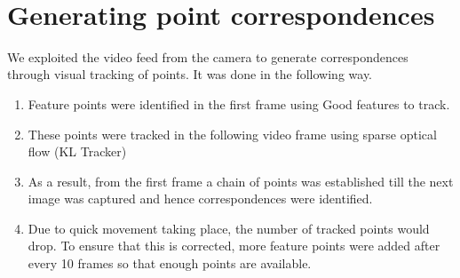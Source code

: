 \documentclass{article}
\begin{document}
		\vspace{3mm}
		\
			\section{Generating point correspondences}
		We exploited the video feed from the camera to generate correspondences through visual tracking of points. It was done in the following way.
		\begin{enumerate}
			\item Feature points were identified in the first frame using \cite{goodfeatures} Good features to track.
			\item These points were tracked in the following video frame using sparse optical flow \cite{KLT} (KL Tracker)
			\item As a result, from the first frame a chain of points was established till the next image was captured and hence correspondences were identified.
			\item Due to quick movement taking place, the number of tracked points would drop. To ensure that this is corrected, more feature points were added after every 10 frames so that enough points are available.
		\end{enumerate}
\end{document}
